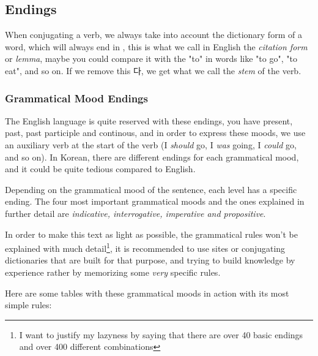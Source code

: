 \subsection{Endings}

When conjugating a verb, we always take into account the dictionary form of a word, which will always end in , this is what we call in English the \textit{citation form} or \textit{lemma}, maybe you could compare it with the "to" in words like "to go", "to eat", and so on. If we remove this 다, we get what we call the \textit{stem} of the verb.

\subsubsection{Grammatical Mood Endings}
The English language is quite reserved with these endings, you have present, past, past participle and continous, and in order to express these moods, we use an auxiliary verb at the start of the verb (I \textit{should} go, I \textit{was} going, I \textit{could} go, and so on). In Korean, there are different endings for each grammatical mood, and it could be quite tedious compared to English.

Depending on the grammatical mood  of the sentence, each level has a specific ending. The four most important grammatical moods and the ones explained in further detail are \textit{indicative, interrogative, imperative and propositive}.

In order to make this text as light as possible, the grammatical rules won't be explained with much detail\footnote{I want to justify my lazyness by saying that there are over 40 basic endings and over 400 different combinations}, it is recommended to use sites or conjugating dictionaries that are built for that purpose, and trying to build knowledge by experience rather by memorizing some \textit{very} specific rules.

Here are some tables with these grammatical moods in action with its most simple rules:





